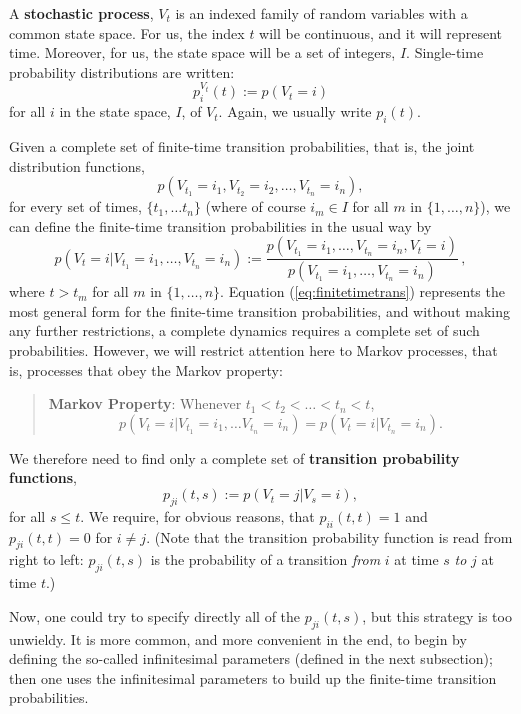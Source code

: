 \documentclass[12pt]{article}
\newcommand{\be}{\begin{equation}}
\newcommand{\ee}{\end{equation}}
\begin{document}
A {\bf stochastic process}, $V_{t}$ is an indexed family of random
variables with a common state space.  For us, the index $t$ will be
continuous, and it will represent time.  Moreover, for us, the state
space will be a set of integers, $I$.  Single-time probability
distributions are written:
\be
p^{V_t}_{i}(t) := p(V_{t} = i)
\ee
\noindent for all $i$ in the state space, $I$, of $V_{t}$.  Again, we
usually write $p_{i}(t)$.

Given a complete set of finite-time transition probabilities, that
is, the joint distribution functions,
\be
p(V_{t_{1}} = i_{1}, V_{t_{2}} = i_{2}, \ldots , V_{t_{n}} = i_{n}),
\ee
for every set of times, $\{t_{1}, \ldots t_{n}\}$ (where of course
$i_{m} \in I$ for all $m$ in $\{1, \ldots , n\}$), we can define the
finite-time transition probabilities in the usual way by
\be
\label{eq:finitetimetrans}
p(V_{t} = i | V_{t_{1}} = i_{1}, \ldots , V_{t_{n}} = i_{n}) :=
\frac{p(V_{t_{1}} = i_{1}, \ldots , V_{t_{n}} = i_{n}, V_{t} =
i)}{p(V_{t_{1}} = i_{1}, \ldots , V_{t_{n}} = i_{n})}\, ,
\ee
where $t > t_m$ for all $m$ in $\{1, \ldots , n \}$.  Equation
(\ref{eq:finitetimetrans}) represents the most general form for the
finite-time transition probabilities, and without making any further
restrictions, a complete dynamics requires a complete set of such
probabilities.  However, we will restrict attention here to Markov
processes, that is, processes that obey the Markov property:
\begin{quotation}
{\bf Markov Property}:  Whenever $t_{1} < t_{2} < \ldots < t_{n} < t$,
\be
p(V_{t} = i | V_{t_{1}} = i_{1}, \ldots V_{t_{n}} = i_n) =
p(V_{t} = i | V_{t_{n}} = i_n).
\ee
\end{quotation}
\noindent We therefore need to find only a complete set of {\bf transition
probability functions},
\be
p_{ji}(t,s) := p(V_{t} = j | V_{s} = i),
\ee
for all $s \leq t$.  We require, for obvious reasons, that
$p_{ii}(t,t) = 1$ and $p_{ji}(t,t) = 0$ for $i \neq j$.  (Note
that the transition probability function is read from right to left:
$p_{ji}(t,s)$ is the probability of a transition {\it from} $i$ at time $s$
{\it to} $j$ at time $t$.)

Now, one could try to specify directly all of the $p_{ji}(t,s)$,
but this strategy is too unwieldy.  It is more common, and more
convenient in the end, to begin by defining the so-called
infinitesimal parameters (defined in the next subsection); then one uses
the infinitesimal parameters to build up the finite-time transition
probabilities.
\end{document}
